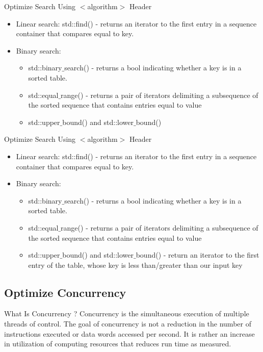 \documentclass[aspectratio=169,xcolor=dvipsnames]{beamer}
\begin{document}
\begin{frame}{Optimize Search Using $<$algorithm$>$ Header}
    \begin{itemize}
        \item Linear search: std::find() - returns an iterator to the first entry in a sequence container that compares equal to key.
        \item Binary search:
        \begin{itemize}
            \item std::binary$\_$search() - returns a bool indicating whether a key is in a sorted table.
            \item std::equal$\_$range() - returns a pair of iterators delimiting a subsequence of the sorted sequence that contains entries equal to value
            \item std::upper$\_$bound() and std::lower$\_$bound()
        \end{itemize}
    \end{itemize}
\end{frame}

\begin{frame}{Optimize Search Using $<$algorithm$>$ Header}
    \begin{itemize}
        \item Linear search: std::find() - returns an iterator to the first entry in a sequence container that compares equal to key.
        \item Binary search:
        \begin{itemize}
            \item std::binary$\_$search() - returns a bool indicating whether a key is in a sorted table.
            \item std::equal$\_$range() - returns a pair of iterators delimiting a subsequence of the sorted sequence that contains entries equal to value
            \item std::upper$\_$bound() and std::lower$\_$bound() - return an iterator to the first entry of the table, whose key is less than/greater than our input key
        \end{itemize}
    \end{itemize}
\end{frame}

\subsection{Optimize Concurrency}
\begin{frame}{What Is Concurrency ?}
    Concurrency is the simultaneous execution of multiple threads of control. The goal of concurrency is not a reduction in the number of instructions executed or data words accessed per second. It is rather an increase in utilization of computing resources that reduces run time as measured.
\end{frame}
\end{document}

